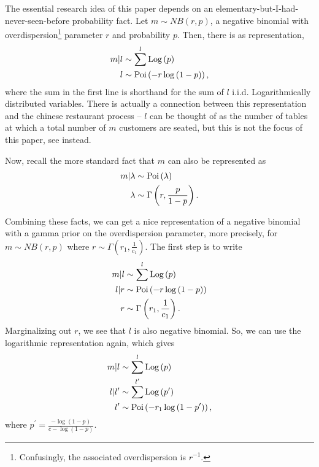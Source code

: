 \documentclass{article}
\begin{document}
The essential research idea of this paper depends on an
elementary-but-I-had-never-seen-before probability fact. Let $m \sim NB\left(r,
p\right)$, a negative binomial with overdispersion\footnote{Confusingly, the
  associated overdispersion is $r^{-1}$.} parameter $r$ and probability $p$. Then, there is as representation,
\begin{align}
  m \vert l &\sim \sum^{l} \textnormal{Log}\left(p\right) \\
  l &\sim \textnormal{Poi}\left(-r \log\left(1 - p\right)\right),
\end{align}
where the sum in the first line is shorthand for the sum of $l$ i.i.d.
Logarithmically distributed variables. There is actually a connection between
this representation and the chinese restaurant process -- $l$ can be thought of
as the number of tables at which a total number of $m$ customers are seated, but
this is not the focus of this paper, see \citep{zhou2015negative} instead.

Now, recall the more standard fact that $m$ can also be represented as
\begin{align}
  m \vert \lambda &\sim \textnormal{Poi}\left(\lambda\right) \\
  \lambda &\sim \Gamma\left(r, \frac{p}{1 - p}\right).
\end{align}

Combining these facts, we can get a nice representation of a negative binomial
with a gamma prior on the overdispersion parameter, more precisely, for $m \sim
NB\left(r, p\right)$ where $r \sim \Gamma\left(r_{1}, \frac{1}{c_{1}}\right)$.
The first step is to write
\begin{align}
  m \vert l &\sim \sum^{l} \textnormal{Log}\left(p\right) \\
  l \vert r &\sim \textnormal{Poi}\left(-r\log\left(1 - p\right)\right) \\
  r &\sim \Gamma\left(r_{1}, \frac{1}{c_{1}}\right).
\end{align}
Marginalizing out $r$, we see that $l$ is also negative binomial. So, we can use
the logarithmic representation again, which gives
\begin{align}
  m \vert l &\sim \sum^{l} \textnormal{Log}\left(p\right) \\
  l \vert l^{\prime} &\sim \sum^{l^{\prime}} \textnormal{Log}\left(p^{\prime}\right) \\
  l^{\prime} &\sim \textnormal{Poi}\left(-r_{1} \log\left(1 - p^{\prime}\right)\right),
\end{align}
where $p^{\prime} = \frac{-\log\left(1 - p\right)}{c - \log\left(1 - p\right)}$.
\end{document}
